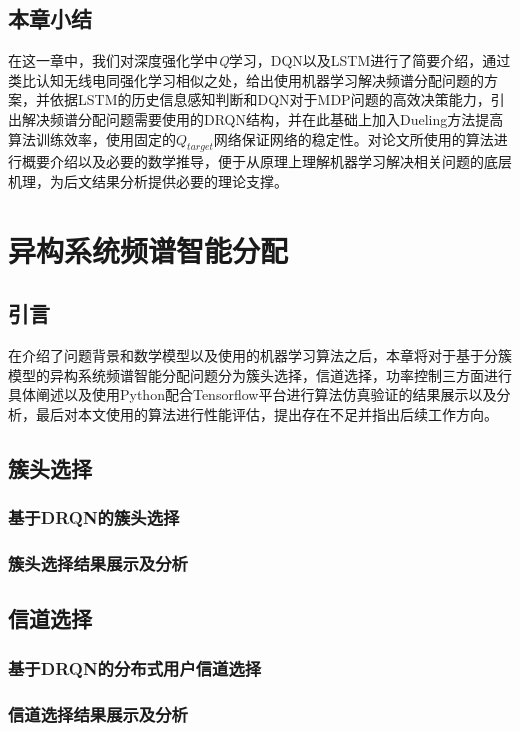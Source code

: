 \section{本章小结}
在这一章中，我们对深度强化学中\textit{Q}学习，DQN以及LSTM进行了简要介绍，通过类比认知无线电同强化学习相似之处，给出使用机器学习解决频谱分配问题的方案，并依据LSTM的历史信息感知判断和DQN对于MDP问题的高效决策能力，引出解决频谱分配问题需要使用的DRQN结构，并在此基础上加入Dueling方法提高算法训练效率，使用固定的$Q_{target}$网络保证网络的稳定性。对论文所使用的算法进行概要介绍以及必要的数学推导，便于从原理上理解机器学习解决相关问题的底层机理，为后文结果分析提供必要的理论支撑。



\chapter{异构系统频谱智能分配}
\section{引言}
在介绍了问题背景和数学模型以及使用的机器学习算法之后，本章将对于基于分簇模型的异构系统频谱智能分配问题分为簇头选择，信道选择，功率控制三方面进行具体阐述以及使用Python配合Tensorflow平台进行算法仿真验证的结果展示以及分析，最后对本文使用的算法进行性能评估，提出存在不足并指出后续工作方向。
\section{簇头选择}
\subsection{基于DRQN的簇头选择}


\subsection{簇头选择结果展示及分析}

\section{信道选择}
\subsection{基于DRQN的分布式用户信道选择}

\subsection{信道选择结果展示及分析}


